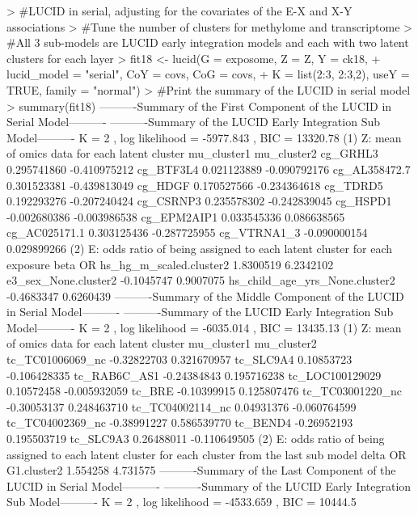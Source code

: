 \begin{example}
> #LUCID in serial, adjusting for the covariates of the E-X and X-Y associations
> #Tune the number of clusters for methylome and transcriptome
> #All 3 sub-models are LUCID early integration models and each with two latent clusters for each layer
> fit18 <- lucid(G = exposome, Z = Z, Y = ck18, 
+                lucid_model = "serial", CoY = covs, CoG = covs, 
+                K = list(2:3, 2:3,2), useY = TRUE, family = "normal")
> #Print the summary of the LUCID in serial model
> summary(fit18)
----------Summary of the First Component of the LUCID in Serial Model---------- 
----------Summary of the LUCID Early Integration Sub Model---------- 
K =  2 , log likelihood = -5977.843 , BIC =  13320.78 
(1) Z: mean of omics data for each latent cluster 
               mu_cluster1  mu_cluster2
cg_GRHL3       0.295741860 -0.410975212
cg_BTF3L4      0.021123889 -0.090792176
cg_AL358472.7  0.301523381 -0.439813049
cg_HDGF        0.170527566 -0.234364618
cg_TDRD5       0.192293276 -0.207240424
cg_CSRNP3      0.235578302 -0.242839045
cg_HSPD1      -0.002680386 -0.003986538
cg_EPM2AIP1    0.033545336  0.086638565
cg_AC025171.1  0.303125436 -0.287725955
cg_VTRNA1_3   -0.090000154  0.029899266
(2) E: odds ratio of being assigned to each latent cluster for each exposure 
                                     beta        OR
hs_hg_m_scaled.cluster2         1.8300519 6.2342102
e3_sex_None.cluster2           -0.1045747 0.9007075
hs_child_age_yrs_None.cluster2 -0.4683347 0.6260439
----------Summary of the Middle Component of the LUCID in Serial Model---------- 
----------Summary of the LUCID Early Integration Sub Model---------- 
K =  2 , log likelihood = -6035.014 , BIC =  13435.13 
(1) Z: mean of omics data for each latent cluster 
                 mu_cluster1  mu_cluster2
tc_TC01006069_nc -0.32822703  0.321670957
tc_SLC9A4         0.10853723 -0.106428335
tc_RAB6C_AS1     -0.24384843  0.195716238
tc_LOC100129029   0.10572458 -0.005932059
tc_BRE           -0.10399915  0.125807476
tc_TC03001220_nc -0.30053137  0.248463710
tc_TC04002114_nc  0.04931376 -0.060764599
tc_TC04002369_nc -0.38991227  0.586539770
tc_BEND4         -0.26952193  0.195503719
tc_SLC9A3         0.26488011 -0.110649505
(2) E: odds ratio of being assigned to each latent cluster for each cluster 
    from the last sub model 
               delta       OR
G1.cluster2 1.554258 4.731575
----------Summary of the Last Component of the LUCID in Serial Model---------- 
----------Summary of the LUCID Early Integration Sub Model---------- 
K =  2 , log likelihood = -4533.659 , BIC =  10444.5 

\end{example}

